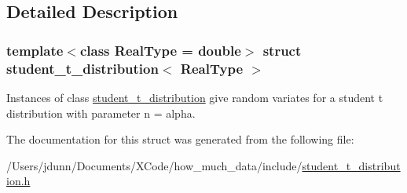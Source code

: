 \subsection{Detailed Description}
\subsubsection*{template$<$class Real\+Type = double$>$\newline
struct student\+\_\+t\+\_\+distribution$<$ Real\+Type $>$}

Instances of class \mbox{\hyperlink{structstudent__t__distribution}{student\+\_\+t\+\_\+distribution}} give random variates for a student t distribution with parameter n = alpha. 

The documentation for this struct was generated from the following file\+:\begin{DoxyCompactItemize}
\item 
/\+Users/jdunn/\+Documents/\+X\+Code/how\+\_\+much\+\_\+data/include/\mbox{\hyperlink{student__t__distribution_8h}{student\+\_\+t\+\_\+distribution.\+h}}\end{DoxyCompactItemize}

